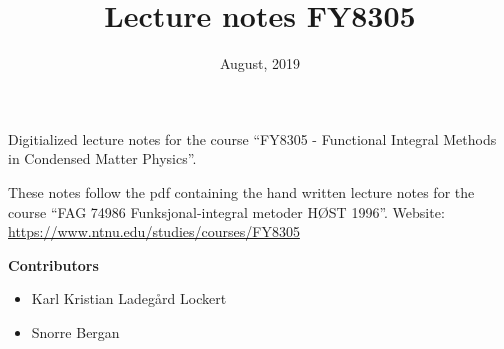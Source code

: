 \documentclass{article}
\title{Lecture notes FY8305}
\date{August, 2019}
\theoremstyle{definition}
\newcommand{\contribs}{%
\begin{center}
\Large 
\textbf{Contributors}
\end{center}


\begin{itemize}
\item Karl Kristian Ladegård Lockert
\item Snorre Bergan
\end{itemize}

}
\begin{document}
\maketitle
Digitialized lecture notes for the course ``FY8305 - Functional Integral Methods in Condensed Matter Physics''.

These notes follow the pdf containing the hand written lecture notes for the course ``FAG 74986 Funksjonal-integral metoder HØST 1996''.
Website: \href{https://www.ntnu.edu/studies/courses/FY8305}{https://www.ntnu.edu/studies/courses/FY8305}
\contribs
\tableofcontents










%
%












\end{document}
